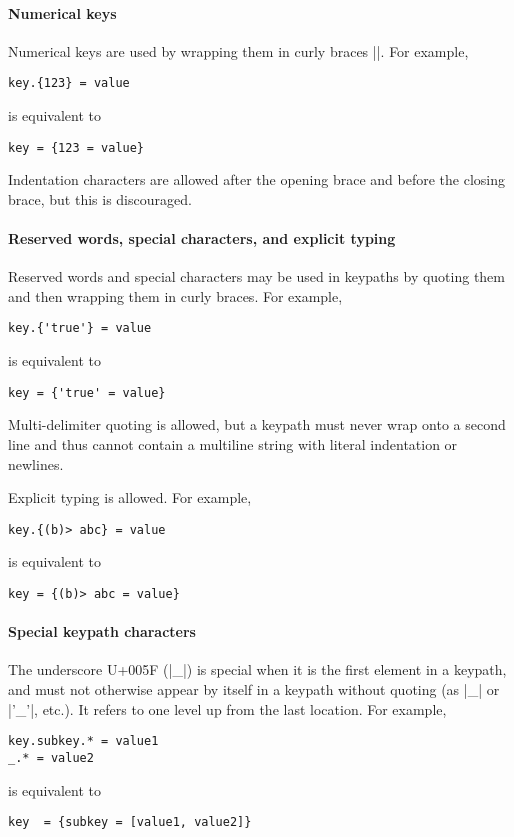\documentclass[11pt]{article}
\begin{document}
{{\paragraph{Numerical keys}

Numerical keys are used by wrapping them in curly braces |{}|.  For example,
\begin{Verbatim}
key.{123} = value
\end{Verbatim}
is equivalent to 
\begin{Verbatim}
key = {123 = value}
\end{Verbatim}
Indentation characters are allowed after the opening brace and before the closing brace, but this is discouraged.

\paragraph{Reserved words, special characters, and explicit typing}

Reserved words and special characters may be used in keypaths by quoting them and then wrapping them in curly braces.  For example,
\begin{Verbatim}
key.{'true'} = value
\end{Verbatim}
is equivalent to 
\begin{Verbatim}
key = {'true' = value}
\end{Verbatim}
Multi-delimiter quoting is allowed, but a keypath must never wrap onto a second line and thus cannot contain a multiline string with literal indentation or newlines.

Explicit typing is allowed.  For example,
\begin{Verbatim}
key.{(b)> abc} = value
\end{Verbatim}
is equivalent to
\begin{Verbatim}
key = {(b)> abc = value}
\end{Verbatim}


\paragraph{Special keypath characters}

The underscore U+005F (|_|) is special when it is the first element in a keypath, and must not otherwise appear by itself in a keypath without quoting (as |{_}| or |{'_'}|, etc.).  It refers to one level up from the last location.  For example,
\begin{Verbatim}
key.subkey.* = value1
_.* = value2
\end{Verbatim}
is equivalent to
\begin{Verbatim}
key  = {subkey = [value1, value2]}
\end{Verbatim}

}}
\end{document}
